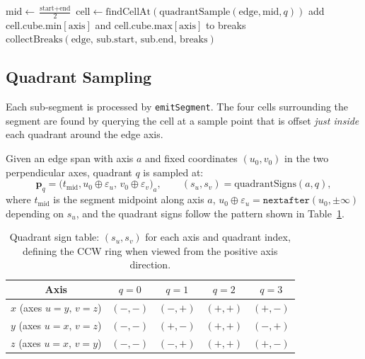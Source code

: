 \documentclass[10pt,a4paper]{article}
\begin{document}
\begin{algorithm}[H]
\caption{\lstinline{collectBreaks}(edge, start, end, breaks)}
\label{alg:breaks}
\begin{algorithmic}[1]
  \Return
\EndIf
\State $\text{mid} \leftarrow \tfrac{\text{start}+\text{end}}{2}$
  \State $\text{cell} \leftarrow \text{findCellAt}(\text{quadrantSample}(\text{edge}, \text{mid}, q))$
  \State add $\text{cell.cube.min}[\text{axis}]$ and $\text{cell.cube.max}[\text{axis}]$ to breaks
\EndFor
{}
  \State $\text{collectBreaks}(\text{edge, sub.start, sub.end, breaks})$
\EndFor
\end{algorithmic}
\end{algorithm}

\subsection{Quadrant Sampling}
\label{sec:itriangles:quadrants}

Each sub-segment is processed by \lstinline{emitSegment}.  The four cells
surrounding the segment are found by querying the cell at a sample point
that is offset \emph{just inside} each quadrant around the edge axis.

Given an edge span with axis $a$ and fixed coordinates $(u_0, v_0)$ in
the two perpendicular axes, quadrant $q$ is sampled at:
\[
  \mathbf{p}_q = \bigl(t_{\text{mid}}, u_0 \oplus \varepsilon_u,\, v_0 \oplus \varepsilon_v\bigr)_a,
  \qquad (s_u, s_v) = \text{quadrantSigns}(a, q),
\]
where $t_{\text{mid}}$ is the segment midpoint along axis $a$,
$u_0 \oplus \varepsilon_u = \texttt{nextafter}(u_0,\pm\infty)$ depending
on $s_u$, and the quadrant signs follow the pattern shown in
Table~\ref{tab:quad_signs}.

\begin{table}[htb]
\centering
\caption{Quadrant sign table: $(s_u, s_v)$ for each axis and quadrant
index, defining the CCW ring when viewed from the positive axis direction.}
\label{tab:quad_signs}
\begin{tabular}{c|cccc}
\toprule
Axis & $q=0$ & $q=1$ & $q=2$ & $q=3$ \\
\midrule
$x$ (axes $u{=}y,\, v{=}z$) & $(-,-)$ & $(-,+)$ & $(+,+)$ & $(+,-)$\\
$y$ (axes $u{=}x,\, v{=}z$) & $(-,-)$ & $(+,-)$ & $(+,+)$ & $(-,+)$\\
$z$ (axes $u{=}x,\, v{=}y$) & $(-,-)$ & $(-,+)$ & $(+,+)$ & $(+,-)$\\
\bottomrule
\end{tabular}
\end{table}
\end{document}
